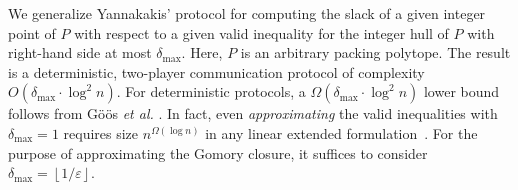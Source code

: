 \documentclass[11pt]{article}
\newcommand{\Z}{\mathbb{Z}}
\newcommand{\floor}[1]{\left\lfloor #1 \right\rfloor}
\newcommand{\eps}{\varepsilon}
\newcommand{\numrounds}{t}
\newcommand{\rhs}{\delta}
\theoremstyle{remark}
\begin{document}






We generalize Yannakakis' protocol for computing the slack of a given integer point of $P$  with respect to a given valid inequality for the integer hull of $P$ with right-hand side at most $\rhs_{\max}$.
Here, $P$ is an arbitrary packing polytope. 
The result is   a deterministic, two-player communication protocol of complexity $O(\rhs_{\max} \cdot \log^2 n)$.  For deterministic protocols, a $\Omega(\rhs_{\max} \cdot \log^2 n)$ lower bound follows from Göös \emph{et al.} \cite{gpw15}. In fact, even \emph{approximating} the valid inequalities with $\rhs_{\max} = 1$ requires size $n^{\Omega(\log n)}$ in any linear extended formulation~\cite{gjpw18}.
For the purpose of approximating the Gomory closure, it suffices to consider $\rhs_{\max} = \floor{1/\eps}$.
\end{document}
